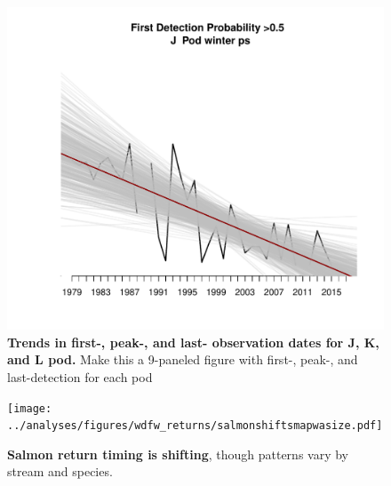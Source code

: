 \documentclass{article}
\begin{document}
\begin{figure}[p]
\includegraphics{../analyses/figures/J/orcaphen_1976_2017_PS_winter_Jfirst.pdf} 
\caption{\textbf{Trends in first-, peak-, and last- observation dates for J, K, and L pod.} Make this a 9-paneled figure with first-, peak-, and last-detection for each pod}
 \label{fig:occupancy}
 \end{figure}

\begin{figure}[p]
\texttt{[image: ../analyses/figures/wdfw\_returns/salmonshiftsmapwasize.pdf]} 
\caption{\textbf{Salmon return timing is shifting}, though patterns vary by stream and species.}
 \label{fig:salmon}
 \end{figure}


\end{document}
